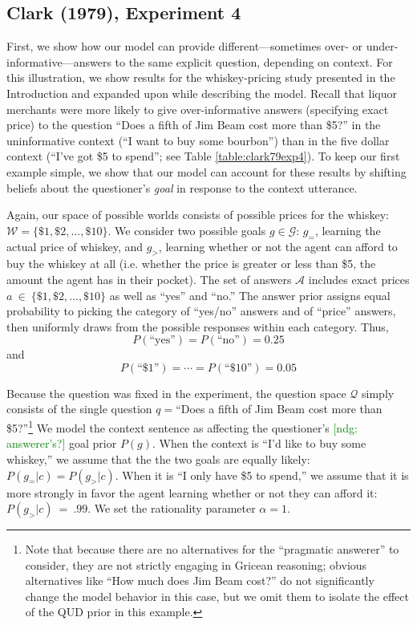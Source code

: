 \documentclass[12pt, floatsintext, jou]{apa6}
\newcommand{\ndg}[1]{\textcolor{Green}{[ndg: #1]}}
\begin{document}
\subsection{Clark (1979), Experiment 4}
First, we show how our model can provide different---sometimes over- or under-informative---answers to the same explicit question, depending on context. For this illustration, we show results for the whiskey-pricing study presented in the Introduction \cite{Clark79_IndirectSpeechActs} and expanded upon while describing the model. Recall that liquor merchants were more likely to give over-informative answers (specifying exact price) to the question ``Does a fifth of Jim Beam cost more than \$5?'' in the uninformative context (``I want to buy some bourbon'') than in the five dollar context (``I've got \$5 to spend''; see Table \ref{table:clark79exp4}). To keep our first example simple, we show that our model can account for these results by shifting beliefs about the questioner's \emph{goal} in response to the context utterance. 


Again, our space of possible worlds consists of possible prices for the whiskey: $\mathcal{W} = \{\$1, \$2, \dots, \$10\}$. We consider two possible goals $g \in \mathcal{G}$: $g_=$, learning the actual price of whiskey,  and $g_>$, learning whether or not the agent can afford to buy the whiskey at all (i.e. whether the price is greater or less than \$5, the amount the agent has in their pocket). The set of answers $\mathcal{A}$ includes exact prices $a~\in~\{\$1, \$2, \dots, \$10\}$ as well as ``yes'' and ``no.'' The answer prior assigns equal probability to picking the category of ``yes/no'' answers and of ``price'' answers, then uniformly draws from the possible responses within each category. Thus, $$P(\textrm{``yes''}) = P(\textrm{``no''}) = 0.25$$ and $$P(\textrm{``\$1''}) = \cdots = P(\textrm{``\$10''}) = 0.05$$

Because the question was fixed in the experiment, the question space $\mathcal{Q}$ simply consists of the single question $q = $``Does a fifth of Jim Beam cost more than \$5?''\footnote{Note that because there are no alternatives for the ``pragmatic answerer'' to consider, they are not strictly engaging in Gricean reasoning; obvious alternatives like ``How much does Jim Beam cost?'' do not significantly change the model behavior in this case, but we omit them to isolate the effect of the QUD prior in this example.}  We model the context sentence as affecting the questioner's \ndg{answerer's?} goal prior $P(g)$. When the context is ``I'd like to buy some whiskey,'' we assume that the the two goals are equally likely: $P(g_= | c) = P(g_> | c)$. When it is ``I only have \$5 to spend,'' we assume that it is more strongly in favor the agent learning whether or not they can afford it: $P(g_> | c)~=~.99$. We set the rationality parameter $\alpha = 1$.
\end{document}

